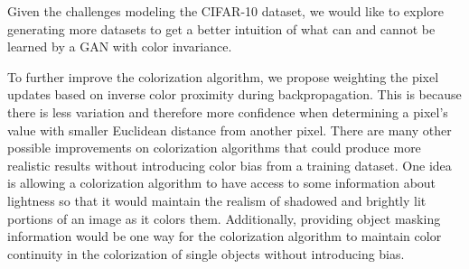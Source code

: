 \documentclass[10pt,twocolumn,letterpaper]{article}
\begin{document}
Given the challenges modeling the CIFAR-10 dataset, we would like to explore generating more datasets to get a better intuition of what can and cannot be learned by a GAN with color invariance.

To further improve the colorization algorithm, we propose weighting the pixel updates based on inverse color proximity during backpropagation. This is because there is less variation and therefore more confidence when determining a pixel's value with smaller Euclidean distance from another pixel. There are many other possible improvements on colorization algorithms that could produce more realistic results without introducing color bias from a training dataset. One idea is allowing a colorization algorithm to have access to some information about lightness so that it would maintain the realism of shadowed and brightly lit portions of an image as it colors them. Additionally, providing object masking information would be one way for the colorization algorithm to maintain color continuity in the colorization of single objects without introducing bias.

    {\small
        
        
    }
\end{document}
